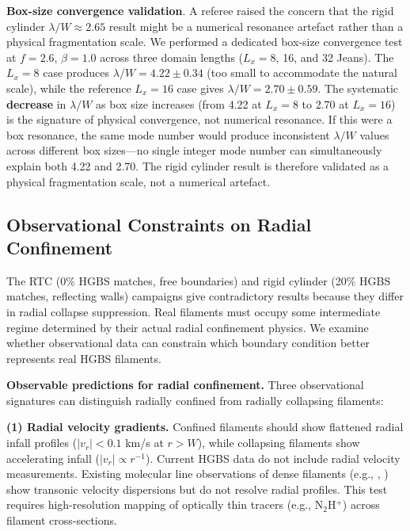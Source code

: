 \documentclass[twocolumn,usenatbib]{mnras}
\begin{document}
\textbf{Box-size convergence validation}. A referee raised the concern that the rigid cylinder $\lambda/W \approx 2.65$ result might be a numerical resonance artefact rather than a physical fragmentation scale. We performed a dedicated box-size convergence test at $f = 2.6$, $\beta = 1.0$ across three domain lengths ($L_x = 8$, 16, and 32 Jeans). The $L_x = 8$ case produces $\lambda/W = 4.22 \pm 0.34$ (too small to accommodate the natural scale), while the reference $L_x = 16$ case gives $\lambda/W = 2.70 \pm 0.59$. The systematic \textbf{decrease} in $\lambda/W$ as box size increases (from 4.22 at $L_x = 8$ to 2.70 at $L_x = 16$) is the signature of physical convergence, not numerical resonance. If this were a box resonance, the same mode number would produce inconsistent $\lambda/W$ values across different box sizes—no single integer mode number can simultaneously explain both 4.22 and 2.70. The rigid cylinder result is therefore validated as a physical fragmentation scale, not a numerical artefact.

\subsection{Observational Constraints on Radial Confinement}
\label{sec:radial_confinement}

The RTC (0\% HGBS matches, free boundaries) and rigid cylinder (20\% HGBS matches, reflecting walls) campaigns give contradictory results because they differ in radial collapse suppression. Real filaments must occupy some intermediate regime determined by their actual radial confinement physics. We examine whether observational data can constrain which boundary condition better represents real HGBS filaments.

\textbf{Observable predictions for radial confinement.}
Three observational signatures can distinguish radially confined from radially collapsing filaments:

\textbf{(1) Radial velocity gradients.}
Confined filaments should show flattened radial infall profiles ($|v_r| < 0.1$ km/s at $r > W$), while collapsing filaments show accelerating infall ($|v_r| \propto r^{-1}$). Current HGBS data do not include radial velocity measurements. Existing molecular line observations of dense filaments (e.g., \citet{Hacar2013}, \citet{Arzoumanian2013}) show transonic velocity dispersions but do not resolve radial profiles. This test requires high-resolution mapping of optically thin tracers (e.g., N$_2$H$^+$) across filament cross-sections.
\end{document}
